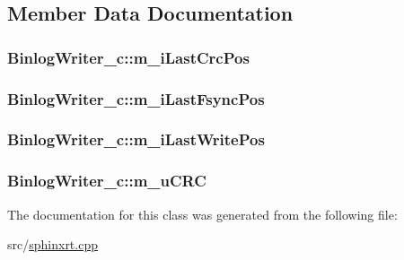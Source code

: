 \subsection{Member Data Documentation}
\hypertarget{classBinlogWriter__c_a687fff645ffca4229438a9ea6c95eeae}{
\subsubsection[{m\-\_\-i\-Last\-Crc\-Pos}]{ Binlog\-Writer\-\_\-c\-::m\-\_\-i\-Last\-Crc\-Pos\hspace{0.3cm}{\ttfamily [private]}}}\label{classBinlogWriter__c_a687fff645ffca4229438a9ea6c95eeae}
\hypertarget{classBinlogWriter__c_a75189762b43b11c78642317aee026ee5}{
\subsubsection[{m\-\_\-i\-Last\-Fsync\-Pos}]{ Binlog\-Writer\-\_\-c\-::m\-\_\-i\-Last\-Fsync\-Pos\hspace{0.3cm}{\ttfamily [private]}}}\label{classBinlogWriter__c_a75189762b43b11c78642317aee026ee5}
\hypertarget{classBinlogWriter__c_a53b7d792d027b67edaeeaf56b505d3cf}{
\subsubsection[{m\-\_\-i\-Last\-Write\-Pos}]{ Binlog\-Writer\-\_\-c\-::m\-\_\-i\-Last\-Write\-Pos\hspace{0.3cm}{\ttfamily [private]}}}\label{classBinlogWriter__c_a53b7d792d027b67edaeeaf56b505d3cf}
\hypertarget{classBinlogWriter__c_a3ec5ac39e5834fcc146241a22d8474d4}{
\subsubsection[{m\-\_\-u\-C\-R\-C}]{ Binlog\-Writer\-\_\-c\-::m\-\_\-u\-C\-R\-C\hspace{0.3cm}{\ttfamily [private]}}}\label{classBinlogWriter__c_a3ec5ac39e5834fcc146241a22d8474d4}


The documentation for this class was generated from the following file\-:\begin{DoxyCompactItemize}
\item 
src/\hyperlink{sphinxrt_8cpp}{sphinxrt.\-cpp}\end{DoxyCompactItemize}
